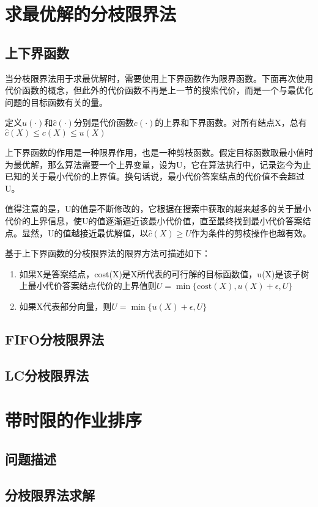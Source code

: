 \section{求最优解的分枝限界法}
\subsection*{上下界函数}
当分枝限界法用于求最优解时，需要使用上下界函数作为限界函数。下面再次使用代价函数的概念，但此外的代价函数不再是上一节的搜索代价，而是一个与最优化问题的目标函数有关的量。

定义$u(\cdot)$和$\hat{c}(\cdot)$分别是代价函数$c(\cdot)$的上界和下界函数。对所有结点X，总有$\hat{c}(X)\leq c(X)\leq u(X)$

上下界函数的作用是一种限界作用，也是一种剪枝函数。假定目标函数取最小值时为最优解，那么算法需要一个上界变量，设为U，它在算法执行中，记录迄今为止已知的关于最小代价的上界值。换句话说，最小代价答案结点的代价值不会超过U。

值得注意的是，U的值是不断修改的，它根据在搜索中获取的越来越多的关于最小代价的上界信息，使U的值逐渐逼近该最小代价值，直至最终找到最小代价答案结点。显然，U的值越接近最优解值，以$\hat{c}(X)\geq U$作为条件的剪枝操作也越有效。

基于上下界函数的分枝限界法的限界方法可描述如下：
\begin{enumerate}
	\item 如果X是答案结点，cost(X)是X所代表的可行解的目标函数值，u(X)是该子树上最小代价答案结点代价的上界值则$U=\min\{\mathrm{cost}(X),u(X)+\epsilon,U\}$
	\item 如果X代表部分向量，则$U=\min\{u(X)+\epsilon,U \}$
\end{enumerate}
\subsection*{FIFO分枝限界法}
\subsection*{LC分枝限界法}
\section{带时限的作业排序}
\subsection*{问题描述}
\subsection*{分枝限界法求解}
